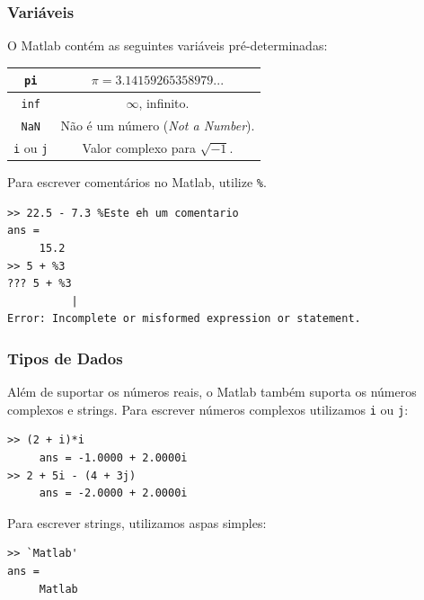 \documentclass{beamer}
\begin{document}
\begin{frame}[fragile]
\frametitle{Vari\'aveis}

O Matlab cont\'em as seguintes vari\'aveis pr\'e-determinadas:

\begin{center}
\begin{tabular}{|c|c|}
\hline
{\tt pi} & $\pi = 3.14159265358979...$ \\ \hline
{\tt inf} & $\infty$, infinito. \\ \hline
{\tt NaN} & N\~ao \'e um n\'umero ({\it Not a Number}). \\ \hline
{\tt i} ou {\tt j} & Valor complexo para $\sqrt{-1}$. \\ \hline
\end{tabular}
\end{center}
\pause 
Para escrever coment\'arios no Matlab, utilize {\tt \%}.{\small
\begin{verbatim}
>> 22.5 - 7.3 %Este eh um comentario
ans = 
     15.2
>> 5 + %3
??? 5 + %3
          |
Error: Incomplete or misformed expression or statement.
\end{verbatim}
}
\end{frame}
\begin{frame}[fragile]

\frametitle{Tipos de Dados}

Al\'em de suportar os n\'umeros reais, o Matlab tamb\'em suporta os n\'umeros complexos e strings. Para escrever n\'umeros complexos utilizamos {\tt i} ou {\tt j}:
\pause
\begin{verbatim}
>> (2 + i)*i
     ans = -1.0000 + 2.0000i
>> 2 + 5i - (4 + 3j)
     ans = -2.0000 + 2.0000i
\end{verbatim}

\pause

Para escrever strings, utilizamos aspas simples:

\begin{verbatim}
>> `Matlab'
ans = 
     Matlab
\end{verbatim}

\end{frame}
\end{document}
